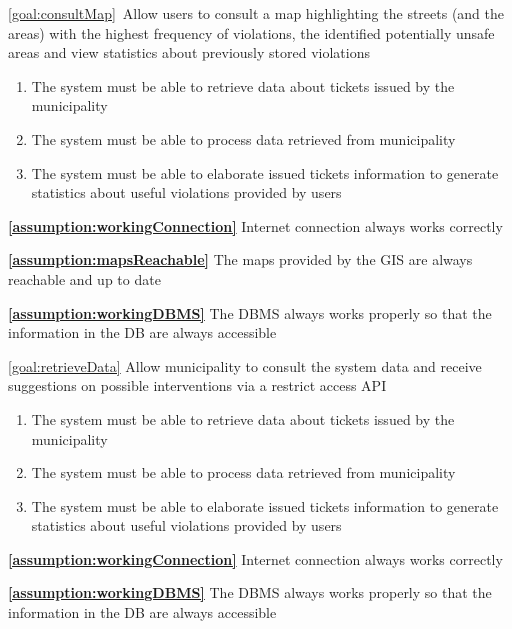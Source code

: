 \begin{description}
  		\item \ref{goal:consultMap}\ Allow users to consult a map highlighting the streets (and the areas) with the highest frequency of violations, the identified potentially unsafe areas and view statistics about previously stored violations
  			\begin{enumerate}[resume*]
   				\item The system must be able to retrieve data about tickets issued by the municipality 
   				\item The system must be able to process data retrieved from municipality
   				\item The system must be able to elaborate issued tickets information to generate statistics about useful violations provided by users
   			\end{enumerate}
   			
   			\textbf{\ref{assumption:workingConnection}} Internet connection always works correctly
   			
   			\textbf{\ref{assumption:mapsReachable}} The maps provided by the GIS are always reachable and up to date
   			
   			\textbf{\ref{assumption:workingDBMS}} The DBMS always works properly so that the information in the DB are always accessible \newline
   			
   		\item \ref{goal:retrieveData} Allow municipality to consult the system data and receive suggestions on possible interventions via a restrict access API 
   				\begin{enumerate}[resume*] 
  				\item The system must be able to retrieve data about tickets issued by the municipality 
   				\item The system must be able to process data retrieved from municipality
   				\item The system must be able to elaborate issued tickets information to generate statistics about useful violations provided by users
   			\end{enumerate}
   			
   			\textbf{\ref{assumption:workingConnection}} Internet connection always works correctly
   			
			\textbf{\ref{assumption:workingDBMS}} The DBMS always works properly so that the information in the DB are always accessible


\end{description}
